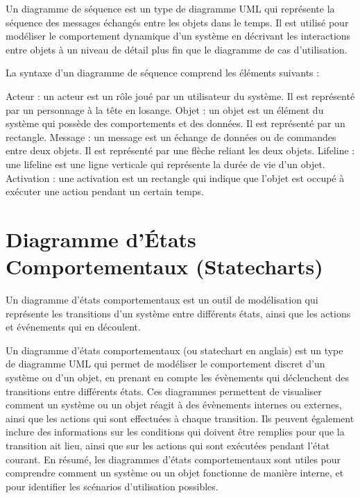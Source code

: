 Un diagramme de séquence est un type de diagramme UML qui représente la séquence des messages échangés entre les objets dans le temps. Il est utilisé pour modéliser le comportement dynamique d'un système en décrivant les interactions entre objets à un niveau de détail plus fin que le diagramme de cas d'utilisation.

La syntaxe d'un diagramme de séquence comprend les éléments suivants :

Acteur : un acteur est un rôle joué par un utilisateur du système. Il est représenté par un personnage à la tête en losange.
Objet : un objet est un élément du système qui possède des comportements et des données. Il est représenté par un rectangle.
Message : un message est un échange de données ou de commandes entre deux objets. Il est représenté par une flèche reliant les deux objets.
Lifeline : une lifeline est une ligne verticale qui représente la durée de vie d'un objet.
Activation : une activation est un rectangle qui indique que l'objet est occupé à exécuter une action pendant un certain temps.

\newpage
\section{Diagramme d'États Comportementaux (Statecharts)}\label{sec:diagrammeetatscomportementaux}
\begin{definition}
Un diagramme d'états comportementaux est un outil de modélisation qui représente les transitions d'un système entre différents états, ainsi que les actions et événements qui en découlent.

Un diagramme d'états comportementaux (ou statechart en anglais) est un type de diagramme UML qui permet de modéliser le comportement discret d'un système ou d'un objet, en prenant en compte les évènements qui déclenchent des transitions entre différents états. Ces diagrammes permettent de visualiser comment un système ou un objet réagit à des évènements internes ou externes, ainsi que les actions qui sont effectuées à chaque transition. Ils peuvent également inclure des informations sur les conditions qui doivent être remplies pour que la transition ait lieu, ainsi que sur les actions qui sont exécutées pendant l'état courant. En résumé, les diagrammes d'états comportementaux sont utiles pour comprendre comment un système ou un objet fonctionne de manière interne, et pour identifier les scénarios d'utilisation possibles.
\end{definition}

